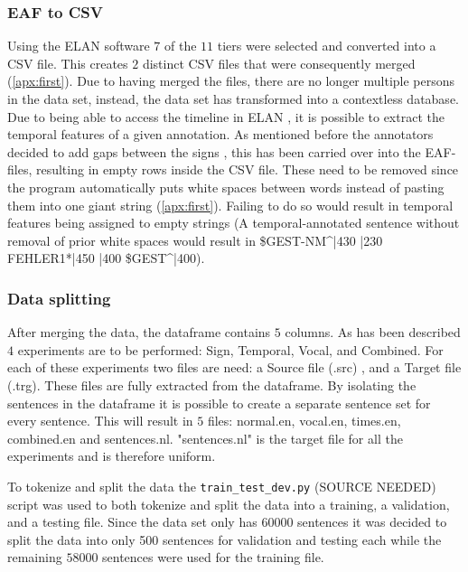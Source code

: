 \subsubsection{EAF to CSV}
Using the ELAN software $7$ of the $11$ tiers were selected and converted into a CSV file. This creates $2$ distinct CSV files that were consequently merged (\autoref{apx:first}). Due to having merged the files, there are no longer multiple persons in the data set, instead, the data set has transformed into a contextless database. Due to being able to access the timeline in ELAN \cite{elan_software}, it is possible to extract the temporal features of a given annotation. As mentioned before the annotators decided to add gaps between the signs \cite{hankesegmentation} \cite{konradoffentliches}, this has been carried over into the EAF-files, resulting in empty rows inside the CSV file. These need to be removed since the program automatically puts white spaces between words instead of pasting them into one giant string (\autoref{apx:first}). Failing to do so would result in temporal features being assigned to empty strings (A temporal-annotated sentence without removal of prior white spaces would result in \$GEST-NM\textasciicircum|430 |230 FEHLER1*|450 |400 \$GEST\textasciicircum|400).

\subsubsection{Data splitting}

After merging the data, the dataframe contains $5$ columns. As has been described $4$ experiments are to be performed: Sign, Temporal, Vocal, and Combined. For each of these experiments two files are need: a Source file (.src) , and a Target file (.trg). These files are fully extracted from the dataframe. By isolating the sentences in the dataframe it is possible to create a separate sentence set for every sentence. This will result in $5$ files: normal.en, vocal.en, times.en, combined.en and sentences.nl. "sentences.nl" is the target file for all the experiments and is therefore uniform.

To tokenize and split the data the \texttt{train\_test\_dev.py} (SOURCE NEEDED) script was used to both tokenize and split the data into a training, a validation, and a testing file. Since the data set only has $60000$ sentences it was decided to split the data into only 500 sentences for validation and testing each while the remaining $58000$ sentences were used for the training file.

